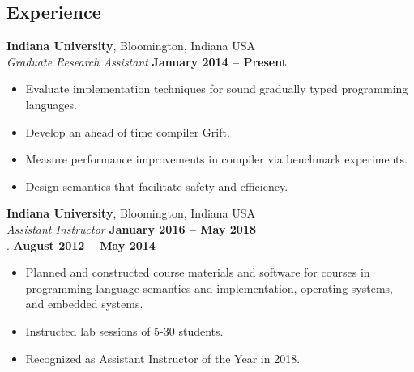 \documentclass[resmargin,line]{res}
\newenvironment{list1}{
  \begin{list}{\ding{113}}{%
      \setlength{\itemsep}{0in}
      \setlength{\parsep}{0in} \setlength{\parskip}{0in}
      \setlength{\topsep}{0in} \setlength{\partopsep}{0in} 
      \setlength{\leftmargin}{0.17in}}}{\end{list}}
\begin{document}
\begin{resume}


\section{\sc Experience}
{\bf Indiana University}, Bloomington, Indiana USA\\
{\em Graduate Research Assistant} \hfill {\bf January 2014 -- Present}\\
%
\begin{itemize}
\vspace*{-.3cm}
\item Evaluate implementation techniques for sound gradually typed
  programming languages.
\item Develop an ahead of time compiler Grift.
\item Measure performance improvements in compiler via benchmark experiments.
\item Design semantics that facilitate safety and efficiency.
\end{itemize}

{\bf Indiana University}, Bloomington, Indiana USA\\
{\em Assistant Instructor} \hfill {\bf January 2016 -- May 2018}\\
{\color{white} . } \quad \hfill {\bf August 2012 -- May 2014}\\
%
\begin{itemize}
\vspace*{-.35cm}
\item Planned and constructed course materials and software for
  courses in programming language semantics and implementation,
  operating systems, and embedded systems.
\item Instructed lab sessions of 5-30 students.
\item Recognized as Assistant Instructor of the Year in 2018.
\end{itemize}
%



\end{resume}
\end{document}

